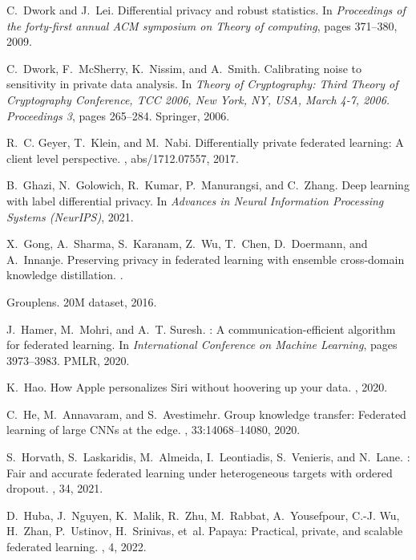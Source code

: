 \documentclass{article}
\begin{document}
\begin{thebibliography}{10}
C.~Dwork and J.~Lei.
\newblock Differential privacy and robust statistics.
\newblock In {\em Proceedings of the forty-first annual ACM symposium on Theory
  of computing}, pages 371--380, 2009.

C.~Dwork, F.~McSherry, K.~Nissim, and A.~Smith.
\newblock Calibrating noise to sensitivity in private data analysis.
\newblock In {\em Theory of Cryptography: Third Theory of Cryptography
  Conference, TCC 2006, New York, NY, USA, March 4-7, 2006. Proceedings 3},
  pages 265--284. Springer, 2006.

R.~C. Geyer, T.~Klein, and M.~Nabi.
\newblock Differentially private federated learning: {A} client level
  perspective.
, abs/1712.07557, 2017.

B.~Ghazi, N.~Golowich, R.~Kumar, P.~Manurangsi, and C.~Zhang.
\newblock Deep learning with label differential privacy.
\newblock In {\em Advances in Neural Information Processing Systems (NeurIPS)},
  2021.

X.~Gong, A.~Sharma, S.~Karanam, Z.~Wu, T.~Chen, D.~Doermann, and A.~Innanje.
\newblock Preserving privacy in federated learning with ensemble cross-domain
  knowledge distillation.
.

Grouplens.
 {20M} dataset, 2016.

J.~Hamer, M.~Mohri, and A.~T. Suresh.
: A communication-efficient algorithm for federated
  learning.
\newblock In {\em International Conference on Machine Learning}, pages
  3973--3983. PMLR, 2020.

K.~Hao.
\newblock How {A}pple personalizes {S}iri without hoovering up your data.
, 2020.

C.~He, M.~Annavaram, and S.~Avestimehr.
\newblock Group knowledge transfer: Federated learning of large {CNNs} at the
  edge.
,
  33:14068--14080, 2020.

S.~Horvath, S.~Laskaridis, M.~Almeida, I.~Leontiadis, S.~Venieris, and N.~Lane.
: Fair and accurate federated learning under heterogeneous
  targets with ordered dropout.
, 34, 2021.

D.~Huba, J.~Nguyen, K.~Malik, R.~Zhu, M.~Rabbat, A.~Yousefpour, C.-J. Wu,
  H.~Zhan, P.~Ustinov, H.~Srinivas, et~al.
\newblock Papaya: Practical, private, and scalable federated learning.
, 4, 2022.


\end{thebibliography}
\end{document}
